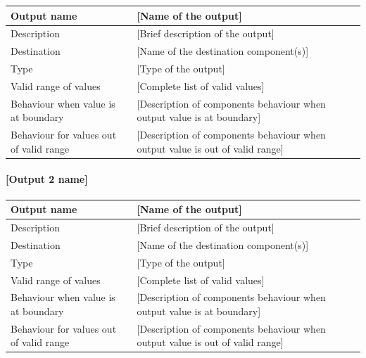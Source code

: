 \begin{longtable}{p{}p{}}
\toprule
Output name				& [Name of the output] \\
\midrule
Description				& [Brief description of the output] \\
\midrule
Destination				& [Name of the destination component(s)] \\ 
\midrule
Type					& [Type of the output] \\
\midrule
Valid range of values	& [Complete list of valid values] \\
\midrule
Behaviour when value is at boundary	& [Description of components behaviour when output value is at boundary] \\
\midrule
Behaviour for values out of valid range	& [Description of components behaviour when output value is out of valid range] \\
\bottomrule
\end{longtable}


\paragraph{[Output 2 name]}

\begin{longtable}{p{}p{}}
\toprule
Output name				& [Name of the output] \\
\midrule
Description				& [Brief description of the output] \\
\midrule
Destination				& [Name of the destination component(s)] \\ 
\midrule
Type					& [Type of the output] \\
\midrule
Valid range of values	& [Complete list of valid values] \\
\midrule
Behaviour when value is at boundary	& [Description of components behaviour when output value is at boundary] \\
\midrule
Behaviour for values out of valid range	& [Description of components behaviour when output value is out of valid range] \\
\bottomrule
\end{longtable}
